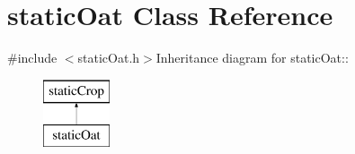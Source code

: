 \hypertarget{classstatic_oat}{
\section{staticOat Class Reference}
\label{classstatic_oat}
}


{\ttfamily \#include $<$staticOat.h$>$}Inheritance diagram for staticOat::\begin{figure}[H]
\begin{center}
\leavevmode
\includegraphics[height=2cm]{classstatic_oat}
\end{center}
\end{figure}
